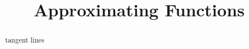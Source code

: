 \documentclass{ximera}
\title{Approximating Functions}
\begin{document}
\begin{abstract}
tangent lines
\end{abstract}
\maketitle
\end{document}
